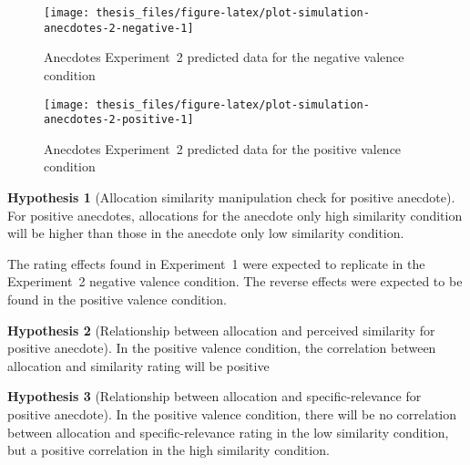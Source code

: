 \documentclass[a4paper, nobind]{templates/ociamthesis}
\theoremstyle{definition}
\theoremstyle{definition}
\theoremstyle{definition}
\theoremstyle{definition}
\newtheorem{hypothesis}{Hypothesis}[chapter]
\theoremstyle{remark}
\begin{document}
\begin{figure}
\texttt{[image: thesis\_files/figure-latex/plot-simulation-anecdotes-2-negative-1]} \caption{Anecdotes Experiment~2 predicted data for the negative valence condition}\label{fig:plot-simulation-anecdotes-2-negative}
\end{figure}



\begin{figure}
\texttt{[image: thesis\_files/figure-latex/plot-simulation-anecdotes-2-positive-1]} \caption{Anecdotes Experiment~2 predicted data for the positive valence condition}\label{fig:plot-simulation-anecdotes-2-positive}
\end{figure}

\begin{hypothesis}[Allocation similarity manipulation check for positive anecdote]
\protect\hypertarget{hyp:similarity-check-anecdotes-2}{}{\label{hyp:similarity-check-anecdotes-2} \iffalse (Allocation similarity manipulation check for positive anecdote) \fi{} }For positive anecdotes, allocations for the anecdote only high similarity
condition will be higher than those in the anecdote only low similarity
condition.
\end{hypothesis}

The rating effects found in Experiment~1 were expected to replicate in the
Experiment~2 negative valence condition. The reverse effects were expected to be
found in the positive valence condition.

\begin{hypothesis}[Relationship between allocation and perceived similarity for positive anecdote]
\protect\hypertarget{hyp:allocation-similarity-anecdotes-2}{}{\label{hyp:allocation-similarity-anecdotes-2} \iffalse (Relationship between allocation and perceived similarity for positive anecdote) \fi{} }In the positive valence condition, the correlation between allocation and
similarity rating will be positive
\end{hypothesis}

\begin{hypothesis}[Relationship between allocation and specific-relevance for positive anecdote]
\protect\hypertarget{hyp:allocation-specific-relevance-anecdotes-2}{}{\label{hyp:allocation-specific-relevance-anecdotes-2} \iffalse (Relationship between allocation and specific-relevance for positive anecdote) \fi{} }In the positive valence condition, there will be no correlation between
allocation and specific-relevance rating in the low similarity condition, but a
positive correlation in the high similarity condition.
\end{hypothesis}
\end{document}
